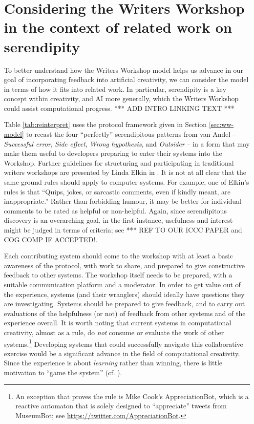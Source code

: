 \section{Considering the Writers Workshop in the context of related work on serendipity}\label{sec:ww-related}

To better understand how the Writers Workshop model helps us advance in our goal of incorporating feedback into artificial creativity, we can consider the model in terms of how it fits into related work. In particular, serendipity is a key concept within creativity, and AI more generally, which the Writers Workshop could assist computational progress. *** ADD INTRO LINKING TEXT ***

Table \ref{tab:reinterpret} uses the protocol framework given in Section \ref{sec:ww-model} to recast
the four ``perfectly'' serendipitous patterns from van Andel --
\emph{Successful error}, \emph{Side effect}, \emph{Wrong hypothesis},
and \emph{Outsider} -- in a form that may make them useful to
developers preparing to enter their systems into the Workshop.
%
Further guidelines for structuring and participating in traditional
writers workshops are presented by Linda Elkin in
\cite[pp. 201-203]{gabriel2002writer}.  It is not at all clear that
the same ground rules should apply to computer systems.  For example,
one of Elkin's rules is that ``Quips, jokes, or sarcastic comments,
even if kindly meant, are inappropriate.''  Rather than forbidding
humour, it may be better for individual comments to be rated as
helpful or non-helpful.  Again, since serendipitous discovery is an
overarching goal, in the first instance, usefulness and interest might
be judged in terms of criteria; see  *** REF TO OUR ICCC PAPER and COG COMP IF ACCEPTED!.

Each contributing system should come to the workshop with at least a
basic awareness of the protocol, with work to share, and prepared to
give constructive feedback to other systems.  The workshop itself
needs to be prepared, with a suitable communication platform and a
moderator.  In order to get value out of the experience, systems (and
their wranglers) should ideally have questions they are investigating.
Systems should be prepared to give feedback, and to carry out
evaluations of the helpfulness (or not) of feedback from other systems
and of the experience overall.  It is worth noting that current
systems in computational creativity, almost as a rule, do \emph{not}
consume or evaluate the work of other systems.\footnote{An exception
  that proves the rule is Mike Cook's {\sf AppreciationBot}, which is
   a reactive automaton that is solely designed to ``appreciate''
   tweets from {\sf MuseumBot}; see
  \url{https://twitter.com/AppreciationBot}.}  Developing systems that
could successfully navigate this collaborative exercise would be a
significant advance in the field of computational creativity.  Since
the experience is about \emph{learning} rather than winning, there is
little motivation to ``game the system''
(cf. \cite{lenat1983eurisko}).

